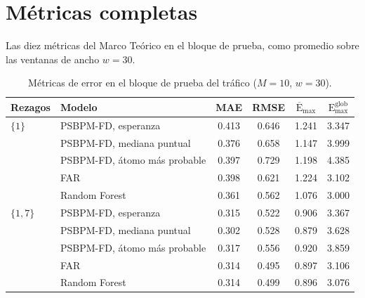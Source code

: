 \section{Métricas completas}
\label{aneC_00_03_metricas}

Las diez métricas del Marco Teórico en el bloque de prueba, como promedio sobre las ventanas de ancho $w = 30$.
\begin{table}[H]
\centering\small
\caption{Métricas de error en el bloque de prueba del tráfico ($M = 10$, $w = 30$).}
\label{tab:aneC_A}
\begin{tabular}{l l cccc}
\hline
Rezagos & Modelo & MAE & RMSE & $\overline{\mathrm{E}}_{\max}$ & $\mathrm{E}_{\max}^{\mathrm{glob}}$ \\
\hline
$\{1\}$   & PSBPM-FD, esperanza          & 0.413 & 0.646 & 1.241 & 3.347 \\
          & PSBPM-FD, mediana puntual    & 0.376 & 0.658 & 1.147 & 3.999 \\
          & PSBPM-FD, átomo más probable & 0.397 & 0.729 & 1.198 & 4.385 \\
          & FAR                          & 0.398 & 0.621 & 1.224 & 3.102 \\
          & Random Forest                & 0.361 & 0.562 & 1.076 & 3.000 \\
\hline
$\{1,7\}$ & PSBPM-FD, esperanza          & 0.315 & 0.522 & 0.906 & 3.367 \\
          & PSBPM-FD, mediana puntual    & 0.302 & 0.528 & 0.879 & 3.628 \\
          & PSBPM-FD, átomo más probable & 0.317 & 0.556 & 0.920 & 3.859 \\
          & FAR                          & 0.314 & 0.495 & 0.897 & 3.106 \\
          & Random Forest                & 0.314 & 0.499 & 0.896 & 3.076 \\
\hline
\end{tabular}
\end{table}

